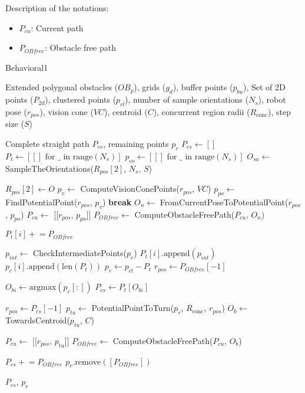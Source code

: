 Description of the notations:
\begin{itemize}[noitemsep,topsep=0pt]
    \item $P_{cu}$: Current path
    \item $P_{OB free}$: Obstacle free path
\end{itemize}

\begin{algorithm}[H]
    \caption{Behavioral1}
    \label{alg:behavioral1}
    \begin{algorithmic}[1]

    \Require Extended polygonal obstacles ($OB_p$), grids ($g_d$), buffer points ($p_{bu}$), Set of 2D points ($P_{2d}$), clustered points ($p_{cl}$), number of sample orientations ($N_s$), robot pose ($r_{pos}$), vision cone ($VC$), centroid ($C$), concurrent region radii ($R_{\text{conc}}$), step size ($S$)

    \Ensure Complete straight path $P_{cs}$, remaining points $p_r$
    \State $P_{cs} \leftarrow []$
    \State $P_t \leftarrow [[] \text{ for } \_ \text{ in range}(N_s)]$
    \State $p_{co} \leftarrow [[] \text{ for } \_ \text{ in range}(N_s)]$
    \State $O_{sa} \leftarrow$ SampleTheOrientations($R_{pos}[2]$, $N_s$, $S$)
    
        \State $R_{pos}[2] \leftarrow O$
            \State $p_v \leftarrow$ ComputeVisionConePoints($r_{pos}$, $VC$)
            \State $p_{po} \leftarrow$ FindPotentialPoint($r_{pos}$, $p_v$)
                \State \textbf{break}
            \EndIf
            \State $O_n \leftarrow$ FromCurrentPoseToPotentialPoint($r_{pos}$, $p_{po}$)
            \State $P_{cu} \leftarrow$ [[$r_{pos}$, $p_{po}$]]
            \State $P_{OB free} \leftarrow$ ComputeObstacleFreePath($P_{cu}$, $O_n$)


            \State $P_t[i] \mathrel{+}= P_{OB free}$
            
            \State $p_{int} \leftarrow$ CheckIntermediatePoints($p_r$)
            \State $P_t[i].\text{append}(p_{int})$
            \State $p_c[i].\text{append}(\text{len}(P_t))$
            \State $p_r \leftarrow p_{cl} - P_t$
            \State $r_{pos} \leftarrow P_{OB free}[-1]$
        \EndWhile
    \EndFor
    
    \State $O_{bi} \leftarrow \text{argmax}(p_c[:])$
    \State $P_{cs} \leftarrow P_t[O_{bi}]$
    
    \State $r_{pos} \leftarrow P_{cs}[-1]$
    \State $p_{tu} \leftarrow$ PotentialPointToTurn($p_r$, $R_{\text{conc}}$, $r_{pos}$)
    \State $O_b \leftarrow$ TowardsCentroid($p_{tu}$, $C$)

    \State $P_{cu} \leftarrow$ [[$r_{pos}$, $p_{tu}$]]
    \State $P_{OB free} \leftarrow$ ComputeObstacleFreePath($P_{cu}$, $O_b$)

    \State $P_{cs} \mathrel{+}= P_{OB free}$
    \State $p_r.\text{remove}([P_{OB free}])$ 
    
    \State \Return $P_{cs}$, $p_r$
    \end{algorithmic}
    \end{algorithm}




